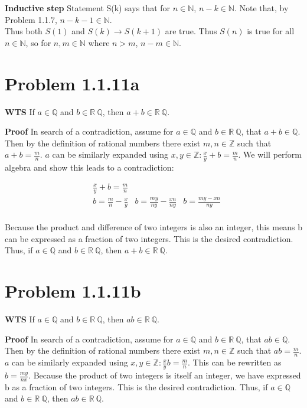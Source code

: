\documentclass[10pt]{article} %
\begin{document}
\textbf{Inductive step} Statement S(k) says that for $n\in\mathbb{N}$, $n-k\in\mathbb{N}$. Note that, by Problem 1.1.7, $n-k-1\in\mathbb{N}$.\\

Thus both $S(1)$ and $S(k)\rightarrow S(k+1)$ are true. Thus $S(n)$ is true for all $n\in\mathbb{N}$, so for $n,m \in \mathbb{N}$ where $n > m$, $n-m \in \mathbb{N}$.\\

\section{Problem 1.1.11a}
\textbf{WTS} If $a \in \mathbb{Q}$ and $b \in \mathbb{R}\ \mathbb{Q}$, then $a+b \in \mathbb{R}\ \mathbb{Q}$.

\textbf{Proof} In search of a contradiction, assume for $a \in \mathbb{Q}$ and $b \in \mathbb{R}\ \mathbb{Q}$, that $a+b \in \mathbb{Q}$. Then by the definition of rational numbers there exist $m,n \in \mathbb{Z}$ such that $a+b = \frac{m}{n}$. $a$ can be similarly expanded using $x,y \in \mathbb{Z}: \frac{x}{y}+b = \frac{m}{n}$. We will perform algebra and show this leads to a contradiction:

\begin{align*}
  &\frac{x}{y}+b = \frac{m}{n}\\
  &b = \frac{m}{n} - \frac{x}{y}
  &b = \frac{my}{ny} - \frac{xn}{ny}
  &b = \frac{my-xn}{ny}\\
\end{align*}

Because the product and difference of two integers is also an integer, this means b can be expressed as a fraction of two integers. This is the desired contradiction. Thus, if $a \in \mathbb{Q}$ and $b \in \mathbb{R}\ \mathbb{Q}$, then $a+b \in \mathbb{R}\ \mathbb{Q}$.

\section{Problem 1.1.11b}
\textbf{WTS} If $a \in \mathbb{Q}$ and $b \in \mathbb{R}\ \mathbb{Q}$, then $ab \in \mathbb{R}\ \mathbb{Q}$.

\textbf{Proof} In search of a contradiction, assume for $a \in \mathbb{Q}$ and $b \in \mathbb{R}\ \mathbb{Q}$, that $ab \in \mathbb{Q}$. Then by the definition of rational numbers there exist $m,n \in \mathbb{Z}$ such that $ab = \frac{m}{n}$. $a$ can be similarly expanded using $x,y \in \mathbb{Z}: \frac{x}{y}b = \frac{m}{n}$. This can be rewritten as $b = \frac{my}{nx}$. Because the product of two integers is itself an integer, we have expressed b as a fraction of two integers. This is the desired contradiction. Thus, if $a \in \mathbb{Q}$ and $b \in \mathbb{R}\ \mathbb{Q}$, then $ab \in \mathbb{R}\ \mathbb{Q}$.
\end{document}
